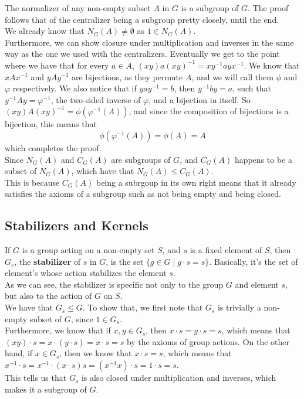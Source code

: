 \documentclass[12pt]{article}
\begin{document}
    The normalizer of any non-empty subset $A$ in $G$
    is a subgroup of $G$.
    The proof follows that of the centralizer being a subgroup
    pretty closely, until the end. \\
    We already know that $N_G(A) \neq \emptyset$
    as $1 \in N_G(A)$. \\
    Furthermore, we can show closure under multiplication and inverses
    in the same way as the one we used with the centralizers.
    Eventually we get to the point where we have that
    for every $a \in A$,
    $(xy)a(xy)^{-1} = xy^{-1}ayx^{-1}$. 
    We know that $xAx^{-1}$ and $yAy^{-1}$ are bijections,
    as they permute $A$,
    and we will call them $\phi$ and $\varphi$ respectively.
    We also notice that if $yay^{-1} = b$,
    then $y^{-1}by = a$,
    such that $y^{-1}Ay = \varphi^{-1}$,
    the two-sided inverse of $\varphi$,
    and a bijection in itself.
    So $(xy)A(xy)^{-1} = \phi(\varphi^{-1}(A))$,
    and since the composition of bijections is a bijection,
    this means that 
    \[ \phi(\varphi^{-1}(A)) = \phi(A) = A \]
    which completes the proof. \\

    Since $N_G(A)$ and $C_G(A)$ are subgroups of $G$,
    and $C_G(A)$ happens to be a subset of $N_G(A)$,
    which have that $N_G(A) \leqslant C_G(A)$. \\
    This is because $C_G(A)$ being a subrgoup in its own right
    means that it already satisfies the axioms of a subgroup
    such as not being empty and being closed. \\

    \subsection*{Stabilizers and Kernels}

    If $G$ is a group acting on a non-empty set $S$,
    and $s$ is a fixed element of $S$,
    then $G_s$, the \textbf{stabilizer} of $s$ in $G$,
    is the set $\{ g \in G \mid g \cdot s = s \}$.
    Basically, it's the set of element's whose
    action stabilizes the element $s$. \\
    As we can see, the stabilizer is specific not only
    to the group $G$ and element $s$,
    but also to the action of $G$ on $S$. \\

    We have that $G_s \leqslant G$.
    To show that, we first note that $G_s$ is trivially
    a non-empty subset of $G$,
    since $1 \in G_s$. \\
    Furthermore, we know that if $x, y \in G_s$,
    then $x\cdot s = y\cdot s = s$,
    which means that $(xy) \cdot s = x \cdot (y \cdot s) = x \cdot s = s$
    by the axioms of group actions.
    On the other hand, if $x \in G_s$,
    then we know that $x \cdot s = s$,
    which means that
    $x^{-1} \cdot s = x^{-1} \cdot (x \cdot s) s = (x^{-1}x) \cdot s 
    = 1 \cdot s = s$. \\
    This tells us that $G_s$ is also closed under multiplication
    and inverses,
    which makes it a subgroup of $G$. \\
    
\end{document}

